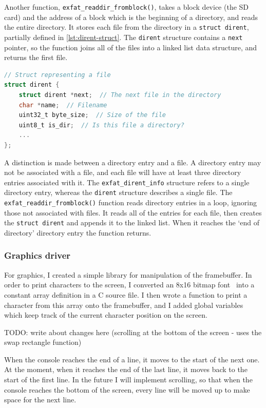 \documentclass{article}
\begin{document}
Another function, \verb!exfat_readdir_fromblock()!, takes a block device (the
SD card) and the address of a block which is the beginning of a directory, and
reads the entire directory. It stores each file from the directory in a
\verb!struct dirent!, partially defined in \autoref{lst:dirent-struct}. The
\verb!dirent! structure contains a \verb!next! pointer, so the function joins
all of the files into a linked list data structure, and returns the first file.

\begin{lstlisting}[language=C, caption={The dirent struct, which stores
                   information about files}, float, label={lst:dirent-struct}]
// Struct representing a file
struct dirent {
    struct dirent *next;  // The next file in the directory
    char *name;  // Filename
    uint32_t byte_size;  // Size of the file
    uint8_t is_dir;  // Is this file a directory?
    ...
};
\end{lstlisting}

A distinction is made between a directory entry and a file. A directory entry
may not be associated with a file, and each file will have at least three
directory entries associated with it. The \verb!exfat_dirent_info! structure
refers to a single directory entry, whereas the \verb!dirent! structure
describes a single file. The \verb!exfat_readdir_fromblock()! function reads
directory entries in a loop, ignoring those not associated with files. It reads
all of the entries for each file, then creates the \verb!struct dirent! and
appends it to the linked list. When it reaches the `end of directory' directory
entry the function returns.

\subsubsection{Graphics driver}
\label{sec:impl_graphics}
For graphics, I created a simple library for manipulation of the framebuffer.
In order to print characters to the screen, I converted an 8x16 bitmap
font~\cite{bizcat-font} into a constant array definition in a C source file. I
then wrote a function to print a character from this array onto the
framebuffer, and I added global variables which keep track of the current
character position on the screen.

TODO: write about changes here (scrolling at the bottom of the screen - uses
the swap rectangle function)

When the console reaches the end of a line, it moves to the start of the next
one. At the moment, when it reaches the end of the last line, it moves back to
the start of the first line. In the future I will implement scrolling, so that
when the console reaches the bottom of the screen, every line will be moved up
to make space for the next line.
\end{document}
